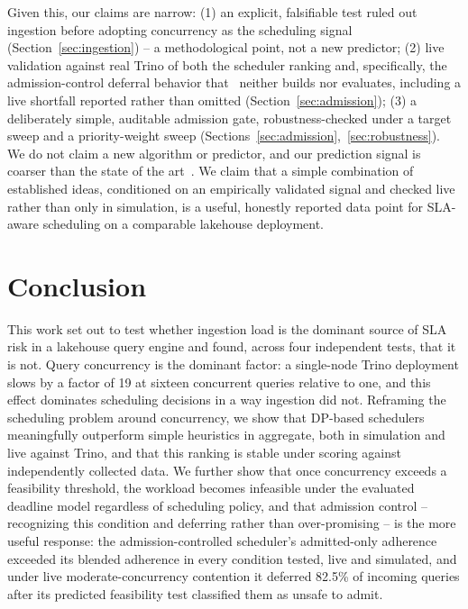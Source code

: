 \documentclass[conference]{IEEEtran}
\begin{document}
Given this, our claims are narrow: (1) an explicit, falsifiable test ruled out ingestion before adopting concurrency as the scheduling signal (Section~\ref{sec:ingestion}) -- a methodological point, not a new predictor; (2) live validation against real Trino of both the scheduler ranking and, specifically, the admission-control deferral behavior that~\cite{wu2025iconqsched} neither builds nor evaluates, including a live shortfall reported rather than omitted (Section~\ref{sec:admission}); (3) a deliberately simple, auditable admission gate, robustness-checked under a target sweep and a priority-weight sweep (Sections~\ref{sec:admission},~\ref{sec:robustness}). We do not claim a new algorithm or predictor, and our prediction signal is coarser than the state of the art~\cite{wu2025iconqsched}. We claim that a simple combination of established ideas, conditioned on an empirically validated signal and checked live rather than only in simulation, is a useful, honestly reported data point for SLA-aware scheduling on a comparable lakehouse deployment.

\section{Conclusion}

This work set out to test whether ingestion load is the dominant source of SLA risk in a lakehouse query engine and found, across four independent tests, that it is not. Query concurrency is the dominant factor: a single-node Trino deployment slows by a factor of 19 at sixteen concurrent queries relative to one, and this effect dominates scheduling decisions in a way ingestion did not. Reframing the scheduling problem around concurrency, we show that DP-based schedulers meaningfully outperform simple heuristics in aggregate, both in simulation and live against Trino, and that this ranking is stable under scoring against independently collected data. We further show that once concurrency exceeds a feasibility threshold, the workload becomes infeasible under the evaluated deadline model regardless of scheduling policy, and that admission control -- recognizing this condition and deferring rather than over-promising -- is the more useful response: the admission-controlled scheduler's admitted-only adherence exceeded its blended adherence in every condition tested, live and simulated, and under live moderate-concurrency contention it deferred 82.5\% of incoming queries after its predicted feasibility test classified them as unsafe to admit.
\end{document}
